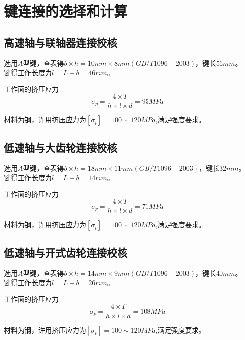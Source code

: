 \section{键连接的选择和计算}
\subsection{高速轴与联轴器连接校核}
选用$A$型键，查表得$b\times h=10mm\times 8mm(GB/T 1096-2003)$，键长$56mm$。
键得工作长度为$l=L-b=46mm$。

工作面的挤压应力
\[
    \sigma_p = \frac{4\times T}{h\times l\times d}=95MPa
\]

材料为钢，许用挤压应力为$[\sigma_p]=100\sim 120MPa$,满足强度要求。
\subsection{低速轴与大齿轮连接校核}
选用$A$型键，查表得$b\times h=18mm\times 11mm(GB/T 1096-2003)$，键长$32mm$。
键得工作长度为$l=L-b=14mm$。

工作面的挤压应力
\[
    \sigma_p = \frac{4\times T}{h\times l\times d}=71MPa
\]
    
材料为钢，许用挤压应力为$[\sigma_p]=100\sim 120MPa$,满足强度要求。

\subsection{低速轴与开式齿轮连接校核}
选用$A$型键，查表得$b\times h=14mm\times 9mm(GB/T 1096-2003)$，键长$40mm$。
键得工作长度为$l=L-b=26mm$。

工作面的挤压应力
\[
    \sigma_p = \frac{4\times T}{h\times l\times d}=108MPa
\]
    
材料为钢，许用挤压应力为$[\sigma_p]=100\sim 120MPa$,满足强度要求。